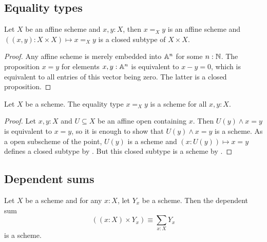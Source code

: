 \subsection{Equality types}

\begin{lemma}%
  \label{affine-equality-closed}
  Let $X$ be an affine scheme and $x,y:X$,
  then $x=_Xy$ is an affine scheme
  and $((x,y):X\times X)\mapsto x=_Xy$
  is a closed subtype of $X\times X$.
\end{lemma}

\begin{proof}
  Any affine scheme is merely embedded into $\mathbb{A}^n$ for some $n:\mathbb{N}$.
  The proposition $x=y$ for elements $x,y:\mathbb{A}^n$ is equivalent to $x-y=0$,
  which is equivalent to all entries of this vector being zero.
  The latter is a closed proposition.
\end{proof}

\begin{proposition}%
  \label{equality-scheme}
  Let $X$ be a scheme.
  The equality type $x=_Xy$ is a scheme for all $x,y:X$.
\end{proposition}

\begin{proof}
  Let $x,y:X$ and
  $U\subseteq X$ be an affine open containing $x$.
  Then $U(y)\wedge x=y$ is equivalent to $x=y$, so it is enough to show that $U(y)\wedge x=y$ is a scheme.
  As a open subscheme of the point, $U(y)$ is a scheme and $(x:U(y))\mapsto x=y$ defines a closed subtype by .
  But this closed subtype is a scheme by .
\end{proof}

\subsection{Dependent sums}

\begin{theorem}%
  \label{sigma-scheme}
  Let $X$ be a scheme and for any $x:X$, let $Y_x$ be a scheme.
  Then the dependent sum
  \[ \left((x:X)\times Y_x\right)\equiv \sum_{x:X}Y_x\]
  is a scheme.
\end{theorem}

